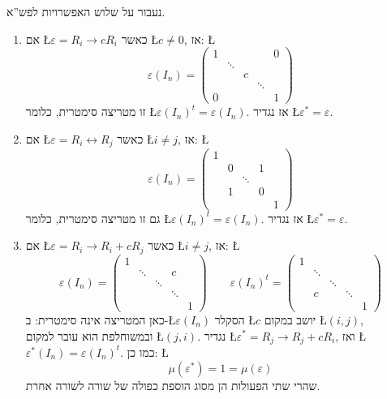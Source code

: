 \documentclass[english,hebrew]{article}
\begin{document}
נעבור על שלוש האפשרויות לפש\textquotedblright א.
\begin{enumerate}
\item אם \L{$\varepsilon=R_{i}\to cR_{i}$} כאשר \L{$c\neq0$}, אז: \L{%
\[
\varepsilon(I_{n})=\begin{pmatrix}1 &  &  &  & 0\\
 & \ddots\\
 &  & c\\
 &  &  & \ddots\\
0 &  &  &  & 1
\end{pmatrix}
\]
}%
זו מטריצה סימטרית, כלומר \L{$\varepsilon(I_{n})^{t}=\varepsilon(I_{n})$}.
אז נגדיר \L{$\varepsilon^{*}=\varepsilon$}.
\item אם \L{$\varepsilon=R_{i}\leftrightarrow R_{j}$} כאשר \L{$i\neq j$},
אז: \L{%
\[
\varepsilon(I_{n})=\begin{pmatrix}1\\
 & 0 &  & 1\\
 &  & \ddots\\
 & 1 &  & 0\\
 &  &  &  & 1
\end{pmatrix}
\]
}%
גם זו מטריצה סימטרית, כלומר \L{$\varepsilon(I_{n})^{t}=\varepsilon(I_{n})$}.
אז נגדיר \L{$\varepsilon^{*}=\varepsilon$}.
\item אם \L{$\varepsilon=R_{i}\to R_{i}+cR_{j}$} כאשר \L{$i\neq j$}, אז:
\L{%
\[
\varepsilon(I_{n})=\begin{pmatrix}1\\
 & \ddots &  & c\\
 &  & \ddots\\
 &  &  & \ddots\\
 &  &  &  & 1
\end{pmatrix}\qquad\varepsilon(I_{n})^{t}=\begin{pmatrix}1\\
 & \ddots\\
 &  & \ddots\\
 & c &  & \ddots\\
 &  &  &  & 1
\end{pmatrix}
\]
}%
כאן המטריצה אינה סימטרית: ב-\L{$\varepsilon(I_{n})$} הסקלר \L{$c$}
יושב במקום \L{$(i,j)$}, ובמשוחלפת הוא עובר למקום \L{$(j,i)$}. נגדיר
\L{$\varepsilon^{*}=R_{j}\to R_{j}+cR_{i}$}, ואז \L{$\varepsilon^{*}(I_{n})=\varepsilon(I_{n})^{t}$}.
כמו כן: \L{%
\[
\mu(\varepsilon^{*})=1=\mu(\varepsilon)
\]
}%
שהרי שתי הפעולות הן מסוג הוספת כפולה של שורה לשורה אחרת.
\end{enumerate}
\end{document}

